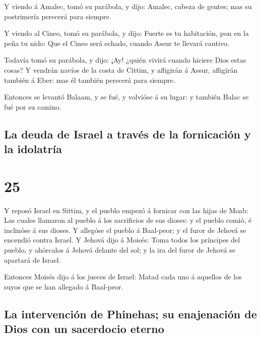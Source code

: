  Y viendo á Amalec, tomó su parábola, y dijo: Amalec,
cabeza de gentes; mas su postrimería perecerá para siempre.

 Y viendo al Cineo, tomó su parábola, y dijo: Fuerte es
tu habitación, pon en la peña tu nido:  Que el Cineo será
echado, cuando Assur te llevará cautivo.

 Todavía tomó su parábola, y dijo: ¡Ay! ¿quién vivirá
cuando hiciere Dios estas cosas?  Y vendrán navíos de la
costa de Cittim, y afligirán á Assur, afligirán también á Eber: mas él
también perecerá para siempre.

 Entonces se levantó Balaam, y se fué, y volvióse á su
lugar: y también Balac se fué por su camino.

\hypertarget{la-deuda-de-israel-a-travuxe9s-de-la-fornicaciuxf3n-y-la-idolatruxeda}{%
\subsection{La deuda de Israel a través de la fornicación y la
idolatría}\label{la-deuda-de-israel-a-travuxe9s-de-la-fornicaciuxf3n-y-la-idolatruxeda}}

\hypertarget{section-24}{%
\section{25}\label{section-24}}

 Y reposó Israel en Sittim, y el pueblo empezó á fornicar
con las hijas de Moab:  Las cuales llamaron al pueblo á
los sacrificios de sus dioses: y el pueblo comió, é inclinóse á sus
dioses.  Y allegóse el pueblo á Baal-peor; y el furor de
Jehová se encendió contra Israel.  Y Jehová dijo á Moisés:
Toma todos los príncipes del pueblo, y ahórcalos á Jehová delante del
sol; y la ira del furor de Jehová se apartará de Israel.

 Entonces Moisés dijo á los jueces de Israel: Matad cada
uno á aquellos de los suyos que se han allegado á Baal-peor.

\hypertarget{la-intervenciuxf3n-de-phinehas-su-enajenaciuxf3n-de-dios-con-un-sacerdocio-eterno}{%
\subsection{La intervención de Phinehas; su enajenación de Dios con un
sacerdocio
eterno}\label{la-intervenciuxf3n-de-phinehas-su-enajenaciuxf3n-de-dios-con-un-sacerdocio-eterno}}

